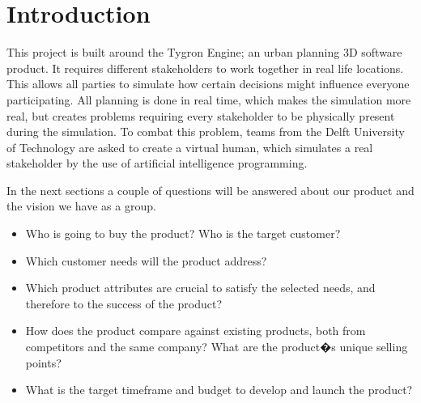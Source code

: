 \section{Introduction}
This project is built around the Tygron Engine; an urban planning 3D software product. It requires different stakeholders to work together in real life locations. This allows all parties to simulate how certain decisions might influence everyone participating. All planning is done in real time, which makes the simulation more real, but creates problems requiring every stakeholder to be physically present during the simulation. To combat this problem, teams from the Delft University of Technology are asked to create a virtual human, which simulates a real stakeholder by the use of artificial intelligence programming. \newline

In the next sections a couple of questions will be answered about our product and the vision we have as a group.
\newline
\begin{itemize}
\item Who is going to buy the product? Who is the target customer?
\item Which customer needs will the product address?
\item Which product attributes are crucial to satisfy the selected needs, and therefore to the success of the product?
\item How does the product compare against existing products, both from competitors and the same company? What are the product�s unique selling points? 
\item What is the target timeframe and budget to develop and launch the product?

\end{itemize}


